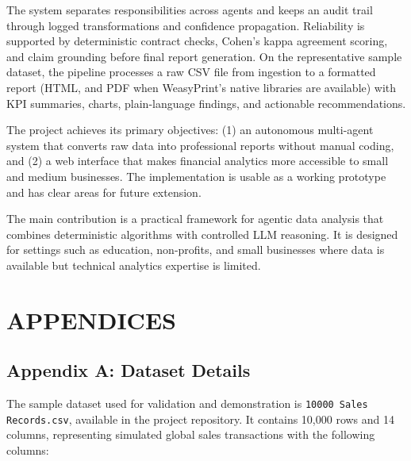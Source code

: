 \documentclass[12pt,a4paper,openany]{report}
\begin{document}
The system separates responsibilities across agents and keeps an audit trail through logged transformations and confidence propagation. Reliability is supported by deterministic contract checks, Cohen's kappa agreement scoring, and claim grounding before final report generation. On the representative sample dataset, the pipeline processes a raw CSV file from ingestion to a formatted report (HTML, and PDF when WeasyPrint's native libraries are available) with KPI summaries, charts, plain-language findings, and actionable recommendations.

The project achieves its primary objectives: (1) an autonomous multi-agent system that converts raw data into professional reports without manual coding, and (2) a web interface that makes financial analytics more accessible to small and medium businesses. The implementation is usable as a working prototype and has clear areas for future extension.

The main contribution is a practical framework for agentic data analysis that combines deterministic algorithms with controlled LLM reasoning. It is designed for settings such as education, non-profits, and small businesses where data is available but technical analytics expertise is limited.

\clearpage
\chapter{APPENDICES}

\section*{Appendix A: Dataset Details}

The sample dataset used for validation and demonstration is \texttt{10000 Sales Records.csv}, available in the project repository. It contains 10,000 rows and 14 columns, representing simulated global sales transactions with the following columns:
\end{document}
